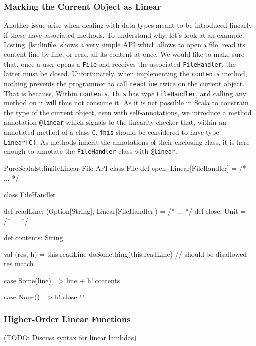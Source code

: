 \documentclass[a4paper,twoside]{article}
\newcommand{\TODO}[1]{\textcolor{YellowOrange}{(TODO: #1)}} %
\newcommand{\RefCode}[1]{Listing~\ref{#1}}
\newcommand{\stt}[1]{\texttt{\small{#1}}}
\begin{document}
\begin{enumerate}
\subsubsection*{Marking the Current Object as Linear}

Another issue arise when dealing with data types meant to be introduced linearly if these have associated methods. To understand why, let's look at an example. \RefCode{lst:linfile} shows a very simple API which allows to open a file, read its content line-by-line, or read all its content at once. We would like to make sure that, once a user opens a \stt{File} and receives the associated \stt{FileHandler}, the latter must be closed. Unfortunately, when implementing the \stt{contents} method, nothing prevents the programmer to call \stt{readLine} twice on the current object. That is because, Within \stt{contents}, \stt{this} has type \stt{FileHandler}, and calling any method on it will thus not consume it. As it is not possible in Scala to constrain the type of the current object, even with self-annotations, we introduce a method annotation \stt{@linear} which signals to the linearity checker that, within an annotated method of a class \stt{C}, \stt{this} should be considered to have type \stt{Linear[C]}. As methods inherit the annotations of their enclosing class, it is here enough to annotate the \stt{FileHandler} class with \stt{@linear}.

\begin{Code}{PureScala}{lst:linfile}{Linear File API}
class File {
  def open: Linear[FileHandler] = /* ... */
}

class FileHandler {
  def readLine: (Option[String], Linear[FileHandler]) = /* ... */
  def close: Unit = /* ... */
  
  def contents: String = {
    val (res, h) = this.readLine
    doSomething(this.readLine) // should be disallowed
    res match {
      case Some(line) =>
        line + h!.contents

      case None() =>
        h!.close
        ""
    }
  }
}
\end{Code}

\subsubsection*{Higher-Order Linear Functions}

\TODO{Discuss syntax for linear lambdas}


\end{enumerate}
\end{document}
